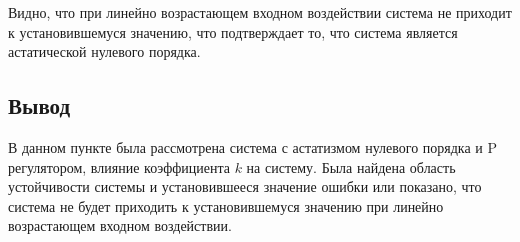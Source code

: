 



Видно, что при линейно возрастающем входном воздействии система не приходит к установившемуся значению, 
что подтверждает то, что система является астатической нулевого порядка. 
\FloatBarrier
\subsection{Вывод}
В данном пункте была рассмотрена система с астатизмом нулевого порядка и P регулятором,
влияние коэффициента $k$ на систему. Была найдена область устойчивости системы и установившееся значение ошибки 
или показано, что система не будет приходить к установившемуся значению при линейно возрастающем входном воздействии.